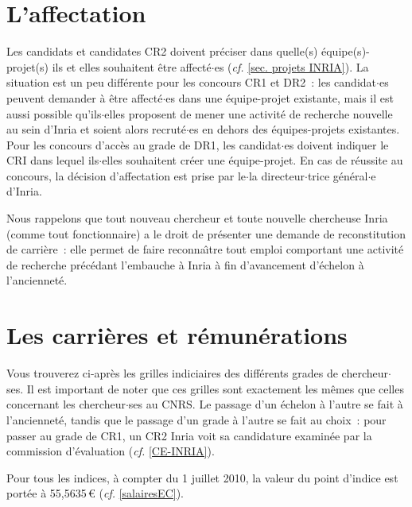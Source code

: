 \section{L'affectation}
Les candidats et candidates CR2 doivent pr\'eciser dans quelle(s) \'equipe(s)-projet(s)
ils et elles souhaitent \^etre affect\'e$\cdot$es ({\em cf.} \ref{sec. projets INRIA}). La situation est
un peu diff\'erente pour les concours CR1 et DR2~: les candidat$\cdot$es
peuvent demander \`a \^etre affect\'e$\cdot$es dans une \'equipe-projet existante, mais
il est aussi possible qu'ils$\cdot$elles proposent de mener une activit\'e de
recherche nouvelle au sein d'Inria et soient alors recrut\'e$\cdot$es en
dehors des \'equipes-projets existantes. Pour les concours d'acc\`es au grade
de DR1, les candidat$\cdot$es doivent indiquer le CRI dans lequel ils$\cdot$elles
souhaitent cr\'eer une \'equipe-projet. En cas de r\'eussite au concours, la
d\'ecision d'affectation est prise par le$\cdot$la directeur$\cdot$trice g\'en\'eral$\cdot$e d'Inria.

Nous rappelons que tout nouveau chercheur et toute nouvelle chercheuse Inria (comme tout
fonctionnaire) a le droit de pr\'esenter une demande de
reconstitution de carri\`ere~: elle permet de faire
reconna\^\i tre tout emploi comportant une activit\'e de
recherche pr\'ec\'edant l'embauche \`a Inria \`a fin d'avancement
d'\'echelon \`a l'anciennet\'e.

\section{Les carri\`eres et r\'emun\'erations}
Vous trouverez ci-apr\`es les grilles indiciaires des diff\'erents
grades de chercheur$\cdot$ses. Il est important de noter que ces grilles sont exactement les m\^emes que celles concernant les chercheur$\cdot$ses au CNRS. Le passage d'un \'echelon \` a l'autre se fait
\` a l'anciennet\'e, tandis que le passage d'un grade \` a l'autre
se fait au choix~: pour passer au grade de CR1, un CR2 Inria
voit sa candidature examin\'ee par la commission
d'\'evaluation ({\em cf.} \ref{CE-INRIA}).

Pour tous les indices, \`a compter du 1\ier{} juillet 2010, la valeur
du point d'indice est port\'ee \`a 55,5635\,\euro{} ({\em cf.}
\ref{salairesEC}).


